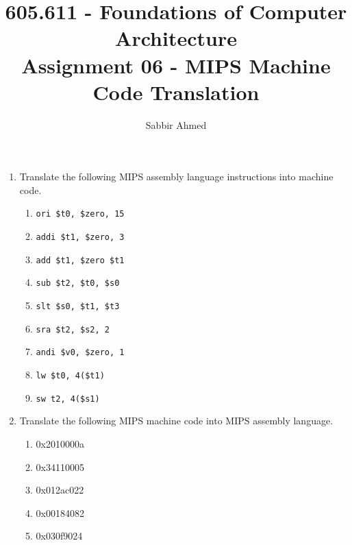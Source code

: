 \documentclass[12pt]{article}
\begin{document}
  \title{605.611 - Foundations of Computer Architecture \\ Assignment 06 - MIPS Machine Code Translation\vspace{-0.5em}}
  \author{Sabbir Ahmed}
  \maketitle
  \vspace{-1em}

  \begin{enumerate}

    \item Translate the following MIPS assembly language instructions into machine code.

    \begin{enumerate}

      \item \texttt{ori \$t0, \$zero, 15}

      \item \texttt{addi \$t1, \$zero, 3}

      \item \texttt{add \$t1, \$zero \$t1}

      \item \texttt{sub \$t2, \$t0, \$s0}

      \item \texttt{slt \$s0, \$t1, \$t3}

      \item \texttt{sra \$t2, \$s2, 2}

      \item \texttt{andi \$v0, \$zero, 1}

      \item \texttt{lw \$t0, 4(\$t1)}

      \item \texttt{sw t2, 4(\$s1)}

    \end{enumerate}

    \item Translate the following MIPS machine code into MIPS assembly language.

    \begin{enumerate}

      \item 0x2010000a
      \item 0x34110005
      \item 0x012ac022
      \item 0x00184082
      \item 0x030f9024

    \end{enumerate}

  \end{enumerate}
\end{document}
